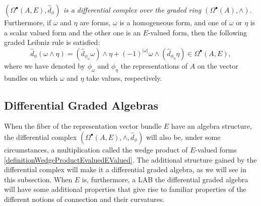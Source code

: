 \begin{theorem}\label{theoFormsAreDiffGModule}
 \textit{$(\Omega^\bullet(A, E), \hat d_\phi)$ is a differential complex over the graded ring $(\Omega^\bullet(A), \wedge)$}. Furthermore, if $\omega$ and $\eta$ are forms, $\omega$ is a homogeneous form, and one of $\omega$ or $\eta$ is a scalar valued form and the other one is an $E$-valued form, then the following graded Leibniz rule is satisfied:
 \begin{equation}\label{equationGradedLeibnizScalarAndEValuedVectorForms}
    \hat d_{\phi} (\omega \wedge \eta) = (\hat d_{\phi_\omega} \omega)\wedge\eta + (-1)^{|\omega|} \omega \wedge (\hat d_{\phi_\eta}\eta) \in \Omega^\bullet(A, E),
 \end{equation}
 where we have denoted by $\phi_{\omega}$ and $\phi_{\eta}$ the representations of $A$ on the vector bundles on which $\omega$ and $\eta$ take values, respectively.
\end{theorem}






\subsection{Differential Graded Algebras}

When the fiber of the representation vector bundle $E$ have an algebra structure, the differential complex $(\Omega^\bullet(A, E), \wedge, \hat d_\phi)$ will also be, under some circumstances, a multiplication called the wedge product of $E$-valued forms \ref{definitionWedgeProductEvaluedEValued}. The additional structure gained by the differential complex will make it a differential graded algebra, as we will see in this subsection. When $E$ is, furthermore, a LAB the differential graded algebra will have some additional properties that give rise to familiar properties of the different notions of connection and their curvatures.

